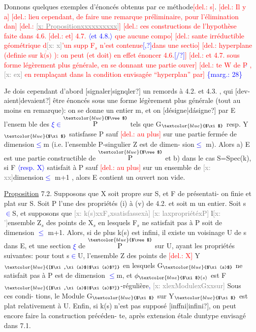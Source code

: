 \documentclass[11pt]{article}
\newcommand{\scanpage}[1]{\par\bigskip\noindent{\small\sffamily[scan #1]}\par}
\newcommand{\mspage}[1]{{\small\sffamily[p.\,#1]}}
\newcommand{\hand}[1]{\textcolor{blue}{#1}}
\let\over\relax
\newcommand{\over}[2]{\textcolor{gray}{#1}\textcolor{blue}{\ensuremath{^{\!\nearrow}}#2}}
\newcommand{\inserted}[2][]{\textcolor{blue}{$\langle$#2$\rangle$}}
\newcommand{\margin}[1]{\textcolor{blue}{\{\textsf{marg.:} #1\}}}
\newcommand{\deleted}[1]{\textcolor{red}{[\textsf{del.:} #1]}}
\newcommand{\xout}[1]{\textcolor{gray}{[\textsf{x:} #1]}}
\newcommand{\uline}[1]{\underline{#1}}
\newcommand{\unsure}[1]{[#1?]}
\begin{document}
Donnons quelques exemples d'énoncés obtenus par ce\over{s}{tte} méthode\deleted{s}. \deleted{Il y a}
\deleted{lieu cependant, de faire une remarque préliminaire, pour l'élimination dan}%
\deleted{\uline{\xout{Propositionxxxxxxxxxx}}}
\deleted{ces constructions de l'hypothèse faite dans 4.6. \deleted{et} 4.7. \inserted{et 4.8.} que  aucune compo}%
\deleted{sante irréductible géométrique d\xout{x}'un supp F$_{s}$ n'est contenue\hand{\unsure{,}}dans une sectio}%
\deleted{hyperplane (definie sur $\overline{\text{k(s)}}$ ): on peut (et doit) en effet énoncer 4.6.\hand{\unsure{/}}}
\deleted{et 4.7. sous forme légèrement plus générale, en se donnant une partie ouver}%
\deleted{te W de P\hand{$\check{}$} , \xout{ex}  en remplaçant dans la condition envisagée  ``hyperplan'' par}
\margin{28}

\clearpage
\scanpage{25/29}
\mspage{\hand{25}}

Je dois cependant d'abord \unsure{signaler|signqler} un remords à 4.2. et 4.3. , qui
\unsure{dev-aient|devaient} être énoncés sous une forme légèrement plus générale (tout au
moins en remarque): on se donne un entier m, et on \unsure{désigne|dásigne} par E l'ensem
ble des \hand{$\xi\in$}$\overset{\hand{$\vee$}}{\text{P}}$ tels que G$_{\hand{$\xi$}}$ resp. Y$_{\hand{$\xi$}}$ satisfasse P sauf \deleted{au plus} sur une
partie fermée de dimension\hand{$\leq$}m (i.e. l'ensemble P-singulier Z est de dimen-%
sion\hand{$\leq$} m). Alors a) E est une partie constructible de $\overset{\hand{$\vee$}}{\text{P}}$ et b) dans le
cas S=Spec(k), si F \inserted[typed]{resp. X} satisfait à P sauf \deleted{au plus} sur un ensemble de
\xout{xx}dimension\hand{$\leq$} m+1 , alors E contient un ouvert non vide.

\uline{Proposition} 7.2. Supposons que X soit propre sur S, et F de présentati-%
on finie et plat sur S. Soit P l'une des propriétés (i) à (v) de 4.2.
et soit m un entier. Soit s\hand{$\in$}S, et supposons que \xout{k(s)xxF$_s$xsatisfassexà}
\xout{laxpropriétéxP} l\xout{'}ensemble Z$_s$ des points de X$_s$ en lesquels F$_s$ ne satisfait
pas à P soit de dimension \hand{$\leq$} m+1. Alors, si de plus k(s) est infini, il
existe un voisinage U de s dans E, et une section \hand{$\xi$} de $\overset{\hand{$\vee$}}{\text{P}}$ sur U, ayant
les propriétés suivantes: pour tout s\hand{$\in$}U, l'ensemble Z des points
de \deleted{X} Y$_{\hand{\unsure{$\xi,\xi(s)$|$\xi(s)$}}}$ en lesquels G$_{\hand{$\xi(s)$}}$ ne satisfait pas à P est de dimension
\hand{$\leq$}m, et $\phi_{\hand{$\xi$}(s)}$ est F$_{\hand{\unsure{$\xi,\xi(s)$|$\xi(s)$}}}$-régulière\hand{,} \xout{xlexModulexGxxsur} Sous ces condi-%
tions, le Module G$_{\hand{$\xi$}}$ sur Y$_{\hand{$\xi$}}$ est plat relativement à U. Enfin, si k(s)
n'est pas supposé \unsure{inffni|infini}, on peut encore faire la construction précéden-%
te, après extension étale duntype envisagé dans 7.1.
\end{document}
